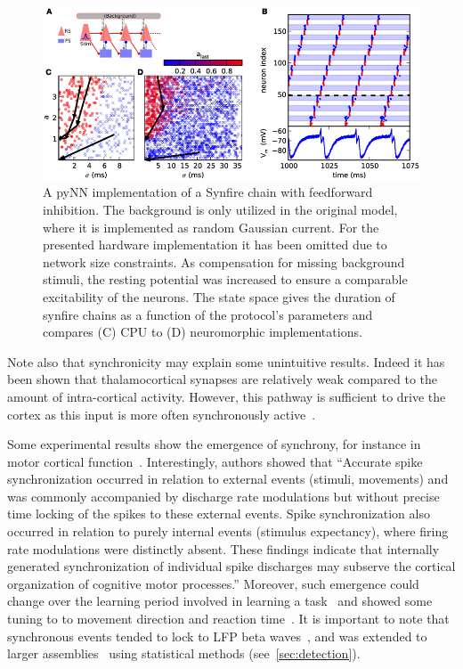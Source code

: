 \documentclass[brainsci, %
               review,submit,pdftex,moreauthors]{Definitions/mdpi}
\begin{document}
\begin{figure}
\centering
\includegraphics{figures/fnins-07-00011-g004.jpg}
\caption{A pyNN implementation of a Synfire chain with feedforward inhibition. The background is only utilized in the original model, where it is implemented as random Gaussian current. For the presented hardware implementation it has been omitted due to network size constraints. As compensation for missing background stimuli, the resting potential was increased to ensure a comparable excitability of the neurons. The state space gives the duration of synfire chains as a function of the protocol's parameters and compares (C) CPU to (D) neuromorphic implementations.}\label{fig:pynn}
\end{figure}
Note also that synchronicity may explain some unintuitive results. Indeed it has been shown that thalamocortical synapses are relatively weak compared to the amount of intra-cortical activity. However, this pathway is sufficient to drive the cortex as this input is more often synchronously active~\citep{bruno_cortex_2006}.

Some experimental results show the emergence of synchrony, for instance in motor cortical function~\citep{riehle_spike_1997}. Interestingly, authors showed that ``Accurate spike synchronization occurred in relation to external events (stimuli, movements) and was commonly accompanied by discharge rate modulations but without precise time locking of the spikes to these external events. Spike synchronization also occurred in relation to purely internal events (stimulus expectancy), where firing rate modulations were distinctly absent. These findings indicate that internally generated synchronization of individual spike discharges may subserve the cortical organization of cognitive motor processes.'' Moreover, such emergence could change over the learning period involved in learning a task~\citep{kilavik_long-term_2009} and showed some tuning to to movement direction and reaction time~\citep{grammont_spike_2003}. It is important to note that synchronous events tended to lock to LFP beta waves~\citep{denker_lfp_2018}, and was extended to larger assemblies~\citep{torre_synchronous_2016} using statistical methods (see~\ref{sec:detection}).
\end{document}
